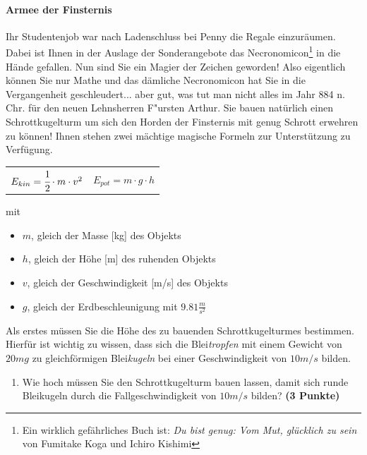 \documentclass[a4paper, 9pt]{scrartcl}\usepackage[]{graphicx}\usepackage[]{xcolor}
\begin{document}
\paragraph{Armee der Finsternis}



Ihr Studentenjob war nach Ladenschluss bei Penny die Regale
einzur{\"a}umen. Dabei ist Ihnen in der Auslage der Sonderangebote das
Necronomicon\footnote{Ein wirklich gef{\"a}hrliches Buch ist:
  \textit{Du bist genug: Vom Mut, gl{\"u}cklich zu sein} von Fumitake Koga und
  Ichiro Kishimi} in die H{\"a}nde gefallen. Nun sind Sie ein Magier der
Zeichen geworden! Also eigentlich k{\"o}nnen Sie nur Mathe und das d{\"a}mliche
Necronomicon hat Sie in die Vergangenheit geschleudert... aber gut, was tut
man nicht alles im Jahr 884 n. Chr. f{\"u}r den neuen Lehnsherren
F{"u}rsten Arthur. Sie bauen nat{\"u}rlich einen Schrottkugelturm um sich den
Horden der Finsternis mit genug Schrott erwehren zu k{\"o}nnen! Ihnen stehen
zwei m{\"a}chtige magische Formeln zur Unterst{\"u}tzung zu Verf{\"u}gung.

\begin{center}
  \begin{tabular}{cc}
    $E_{kin} = \cfrac{1}{2}\cdot m \cdot v^2$ & $E_{pot} = m \cdot g \cdot h$\\
  \end{tabular}
\end{center}

mit

\begin{itemize}
\item $m$, gleich der Masse [kg] des Objekts
\item $h$, gleich der H{\"o}he [m] des ruhenden Objekts
\item $v$, gleich der Geschwindigkeit [m/s] des Objekts
\item $g$, gleich der Erdbeschleunigung mit $9.81 \tfrac{m}{s^2}$ 
\end{itemize}

Als erstes m{\"u}ssen Sie die H{\"o}he des zu bauenden Schrottkugelturmes
bestimmen. Hierf{\"u}r ist wichtig zu wissen, dass sich die
Blei\textit{tropfen} mit einem Gewicht von $20mg$ zu
gleichf{\"o}rmigen Blei\textit{kugeln} bei einer Geschwindigkeit von
$10m/s$ bilden.

\begin{enumerate}
\item Wie hoch m{\"u}ssen Sie den Schrottkugelturm bauen lassen, damit sich
  runde Bleikugeln durch die Fallgeschwindigkeit von $10m/s$ bilden?
  \textbf{(3 Punkte)}
\end{enumerate}
\end{document}
